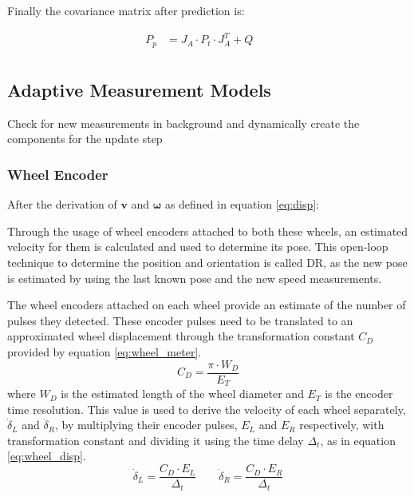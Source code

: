 Finally the covariance matrix after prediction is:

\begin{align}
    P_{p} & = J_A \cdot P_t \cdot J_A^T + Q && \\
\end{align}


\subsection{Adaptive Measurement Models}
\noindent Check for new measurements in background and dynamically create the components for the update step


\subsubsection{Wheel Encoder}

\noindent
After the derivation of $\mathbf{v}$ and $\boldsymbol \omega$ as defined in equation \eqref{eq:disp}:

Through the usage of wheel encoders attached to both these wheels, an estimated velocity for them is calculated and used to determine its pose.
This open-loop technique to determine the position and orientation is called \gls{DR}, as the new pose is estimated by using the last known pose and the new speed measurements.

The wheel encoders attached on each wheel provide an estimate of the number of pulses they detected. These encoder pulses need to be translated to an approximated wheel displacement through the transformation constant $C_{D}$ provided by equation \ref{eq:wheel_meter}.
\begin{equation}
C_{D} = \frac{\pi \cdot W_D }{E_T}
\label{eq:wheel_meter}
\end{equation} where $W_D$ is the estimated length of the wheel diameter and $E_T$ is the encoder time resolution.
This value is used to derive the velocity of each wheel separately, $\dot \delta_L$ and $\dot \delta_R$, by multiplying their encoder pulses, $E_L$ and  $E_R$ respectively, with transformation constant and dividing it using the time delay $\Delta_t$, as in equation \ref{eq:wheel_disp}.
\begin{equation}
\dot \delta_{L} = \frac{C_D \cdot E_L}{\Delta_t}  \qquad
\dot \delta_{R} = \frac{C_D \cdot E_R}{\Delta_t}
\label{eq:wheel_disp}
\end{equation}

